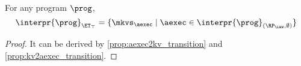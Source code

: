 \begin{corollary}
For any program $\prog$, 
\[
\interpr{\prog}_{\ET_{\top}} = \{\mkvs_{\aexec} \mid \aexec \in \interpr{\prog}_{(\RP_{\LWW}, \emptyset)}\}
\]
\end{corollary}
\begin{proof}
    It can be derived by \cref{prop:aexec2kv_transition} and \cref{prop:kv2aexec_transition}.
\end{proof}


